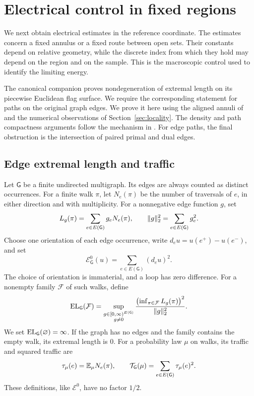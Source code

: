 \section{Electrical control in fixed regions}\label{sec:network}

We next obtain electrical estimates in the reference coordinate.  The
estimates concern a fixed annulus or a fixed route between open sets.  Their
constants depend on relative geometry, while the discrete index from which
they hold may depend on the region and on the sample.  This is the
macroscopic control used to identify the limiting energy.

The canonical companion proves nondegeneration of extremal length on its
piecewise Euclidean flag surface.  We require the corresponding statement
for paths on the original graph edges.  We prove it here using the aligned
annuli of \cite[Theorem~6.4]{C} and the numerical observations of
Section~\ref{sec:locality}.  The density and path compactness arguments
follow the mechanism in \cite[Section~8]{C}.  For edge paths, the final
obstruction is the intersection of paired primal and dual edges.

\subsection{Edge extremal length and traffic}

Let \(\mathsf G\) be a finite undirected multigraph.  Its edges are always
counted as distinct occurrences.  For a finite walk \(\pi\), let
\(N_e(\pi)\) be the number of traversals of \(e\), in either direction and
with multiplicity.  For a nonnegative edge function \(g\), set
\[
 L_g(\pi)=\sum_{e\in E(\mathsf G)}g_eN_e(\pi),
 \qquad
 \lVert g\rVert_2^2=\sum_{e\in E(\mathsf G)}g_e^2.
\]
Choose one orientation of each edge occurrence, write
\(d_eu=u(e^+)-u(e^-)\), and set
\[
 \mathcal E_{\mathsf G}^0(u)
   =\sum_{e\in E(\mathsf G)}(d_eu)^2.
\]
The choice of orientation is immaterial, and a loop has zero difference.
For a nonempty family \(\mathcal F\) of such walks, define
\begin{equation}\label{eq:edge-el}
 \operatorname{EL}_{\mathsf G}(\mathcal F)
 =\sup_{\substack{g\in[0,\infty)^{E(\mathsf G)}\\g\ne0}}
       \frac{\bigl(\inf_{\pi\in\mathcal F}L_g(\pi)\bigr)^2}
            {\lVert g\rVert_2^2}.
\end{equation}
We set \(\operatorname{EL}_{\mathsf G}(\varnothing)=\infty\).  If the graph has no edges
and the family contains the empty walk, its extremal length is \(0\).
For a probability law \(\mu\) on walks, its traffic and squared traffic
are
\begin{equation}\label{eq:edge-traffic}
 \tau_\mu(e)=\mathbb E_\mu N_e(\pi),
 \qquad
 \mathcal T_{\mathsf G}(\mu)=\sum_{e\in E(\mathsf G)}\tau_\mu(e)^2.
\end{equation}
These definitions, like \(\mathcal E^0\), have no factor \(1/2\).

